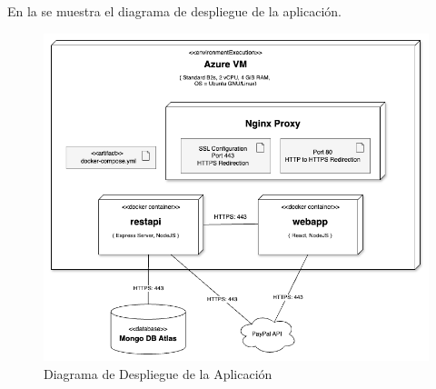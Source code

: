 En la  se muestra el diagrama de despliegue de la aplicación.
\begin{figure}[H]
    \hypertarget{fig:6_6_Diagrama-Despliegue}{}
    \centering
    \includegraphics[width=0.8\linewidth]{figures/6-Analisis/6-Clases/6_5-Deployment.png}
    \caption{Diagrama de Despliegue de la Aplicación}
    \label{fig:6_6_Diagrama-Despliegue}
\end{figure}